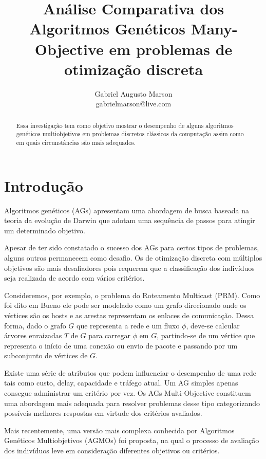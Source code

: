 \documentclass[]{article}
\title{Análise Comparativa dos Algoritmos Genéticos Many-Objective em problemas de otimização discreta}
\author{Gabriel Augusto Marson\\ gabrielmarson@live.com }
\begin{document}
\maketitle

\begin{abstract}
	
	\noindent Essa investigação tem como objetivo mostrar o desempenho de alguns algoritmos genéticos multiobjetivos em problemas discretos clássicos da computação assim como em quais circunstâncias são mais adequados.
	
\end{abstract}

\section{Introdução}	

	Algoritmos genéticos (AGs) apresentam uma abordagem de busca baseada na teoria da evolução de Darwin que adotam uma sequência de passos para atingir um determinado objetivo. 
	
	Apesar de ter sido constatado o sucesso dos AGs para certos tipos de problemas, alguns outros permanecem como desafio. Os de otimização discreta com múltiplos objetivos são mais desafiadores pois requerem que a classificação dos indivíduos seja realizada de acordo com vários critérios.
		
	Consideremos, por exemplo, o problema do Roteamento Multicast (PRM). Como foi dito em Bueno \cite{bueno2010heuristicas} ele pode ser modelado como um grafo direcionado onde os vértices são os hosts e as arestas representam os enlaces de comunicação. Dessa forma, dado o grafo $G$ que representa a rede e um fluxo $\phi$, deve-se calcular árvores enraizadas $T$ de $G$ para carregar $\phi$ em $G$, partindo-se de um vértice que representa o início de uma conexão ou envio de pacote e passando por um subconjunto de vértices de $G$.
	
	Existe uma série de atributos que podem influenciar o desempenho de uma rede tais como custo, delay, capacidade e tráfego atual. Um AG simples apenas consegue administrar um critério por vez. Os AGs Multi-Objective constituem uma abordagem mais adequada para resolver problemas desse tipo categorizando possíveis melhores respostas em virtude dos critérios avaliados.
	
	Mais recentemente, uma versão mais complexa conhecida por Algoritmos Genéticos Multiobjetivos (AGMOs) foi proposta, na qual o processo de avaliação dos indivíduos leve em consideração diferentes objetivos ou critérios.
	
\end{document}

